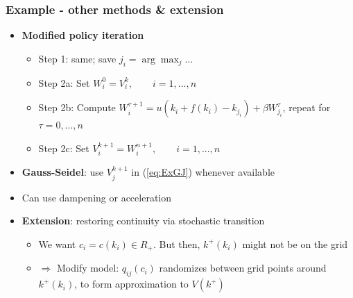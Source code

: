 \documentclass[bigger,handout]{beamer}
\begin{document}
\begin{frame}%

\frametitle{Example - other methods \& extension}

\begin{itemize}
\item \textbf{Modified policy iteration}

\begin{itemize}
\item Step 1: same; save $j_{i}=\arg \max_{j}...$

\item Step 2a: Set $W_{i}^{0}=V_{i}^{k},\qquad i=1,...,n$

\item Step 2b: Compute $W_{i}^{\tau +1}=u(k_{i}+f(k_{i})-k_{j_{i}})+\beta
W_{j_{i}}^{\tau }$, \newline
repeat for $\tau =0,\ldots ,n$

\item Step 2c: Set $V_{i}^{k+1}=W_{i}^{n+1},\qquad i=1,...,n$
\end{itemize}

\item \textbf{Gauss-Seidel}: use $V_{j}^{k+1}$ in (\ref{eq:ExGJ}) whenever
available

\item Can use dampening or acceleration\medskip

\item \textbf{Extension}: restoring continuity via stochastic transition

\begin{itemize}
\item We want $c_{i}=c\left( k_{i}\right) \in R_{+}$. But then, $k^{+}\left(
k_{i}\right) $ might not be on the grid

\item $\Rightarrow $ Modify model: $q_{ij}\left( c_{i}\right) $ randomizes
between \newline
grid points around $k^{+}\left( k_{i}\right) $, to form approximation to $%
V\left( k^{+}\right) $
\end{itemize}
\end{itemize}



\end{frame}%
\end{document}
